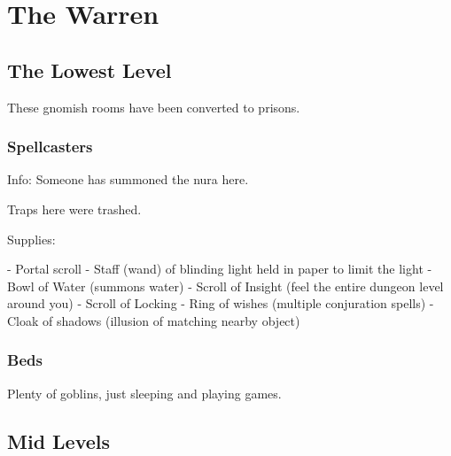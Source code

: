 \chapter{The Warren}

\section{The Lowest Level}

\begin{multicols}{2}
\setcounter{list}{0}


These gnomish rooms have been converted to prisons.

\subsection{Spellcasters}

Info: Someone has summoned the nura here.

Traps here were trashed.

Supplies:

- Portal scroll
- Staff (wand) of blinding light held in paper to limit the light
- Bowl of Water (summons water)
- Scroll of Insight (feel the entire dungeon level around you)
- Scroll of Locking
- Ring of wishes (multiple conjuration spells)
- Cloak of shadows (illusion of matching nearby object)


\subsection{Beds}

Plenty of goblins, just sleeping and playing games.

\end{multicols}

\section{Mid Levels}

